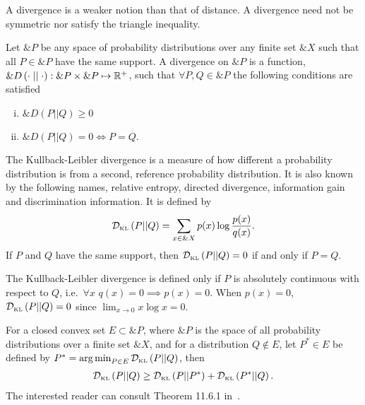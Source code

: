 \begin{remark}
  A divergence is a weaker notion than that of distance. A divergence
  need not be symmetric nor satisfy the triangle inequality.
\end{remark}

\begin{definition}
  Let $\&P$ be any space of probability distributions over any finite
  set $\&X$ such that all $P \in \&P$ have the same support. A
  \textnormal{\sffamily divergence} on $\&P$ is a function,
  $\&D\left( \cdot \mid\mid \cdot \right): \&P \times \&P \mapsto
  \mathbb{R}^+$, such that $\forall P, Q \in \&P$ the following conditions are
  satisfied
  \begin{enumerate}[(i)]
  \item $\&D(P||Q) \geq 0$
  \item $\&D(P||Q) = 0 \iff P = Q$.
  \end{enumerate}
\end{definition}

\begin{definition}
  \label{def:kl-divergence}
  The \textnormal{\sffamily Kullback-Leibler divergence} is a measure
  of how different a probability distribution is from a second,
  reference probability distribution.  It is also known by the
  following names, \textnormal{\sffamily relative entropy},
  \textnormal{\sffamily directed divergence}, \textnormal{\sffamily
    information gain} and \textnormal{\sffamily discrimination
    information}.  It is defined by
  \begin{align}
    \label{eq:KL}
    \mathcal{D}_{\text{\tiny KL}}\left( P \middle| \middle| Q \right) = \sum_{x \in \&X} p(x) \log{p(x) \over q(x)}.
  \end{align}
  If $P$ and $Q$ have the same support, then $\mathcal{D}_{\text{\tiny KL}}\left( P \middle| \middle| Q \right) = 0$ if and
  only if $P = Q$.
\end{definition}

\begin{remark}
  The Kullback-Leibler divergence is defined only if $P$ is absolutely
  continuous with respect to $Q$, i.e.\ $\forall x$
  $q(x) = 0 \implies p(x) = 0$.  When $p(x) = 0$, $\mathcal{D}_{\text{\tiny KL}}\left( P \middle| \middle| Q \right) = 0$
  since $\lim_{x \to 0} x\log{x} = 0$.
\end{remark}

\begin{theorem}
  For a closed convex set $E \subset \&P$, where $\&P$ is the space of
  all probability distributions over a finite set $\&X$, and for a
  distribution $Q \not \in E$, let $P^* \in E$ be defined by
  $P^* = \operatorname*{arg\,min}_{P \in E} \mathcal{D}_{\text{\tiny KL}}\left( P \middle| \middle| Q \right)$, then
  \begin{align}
   \mathcal{D}_{\text{\tiny KL}}\left( P \middle| \middle| Q \right) \geq \mathcal{D}_{\text{\tiny KL}}\left( P \middle| \middle| P^* \right) + \mathcal{D}_{\text{\tiny KL}}\left( P^* \middle| \middle| Q \right).
  \end{align}
  The interested reader can consult Theorem 11.6.1 in~\cite{ref:cover-thomas}.
\end{theorem}

